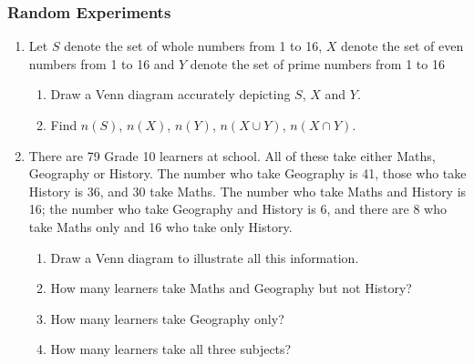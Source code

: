             \subsubsection{  Random Experiments }
            \nopagebreak
          \label{m39377*id111123}\begin{enumerate}[noitemsep, label=\textbf{\arabic*}. ] 
            \label{m39377*uid16}\item  Let $S$ denote the set of
whole numbers from 1 to 16,
$X$ denote the
set of even numbers from 1 to 16 and
$Y$ denote the
set of prime numbers from 1 to 16\label{m39377*id111223}\begin{enumerate}[noitemsep, label=\textbf{\alph*}. ] 
            \label{m39377*uid17}\item Draw a Venn
diagram accurately depicting $S$,
$X$ and \begin{math}Y\end{math}.
\label{m39377*uid18}\item Find $n\left(S\right)$, \begin{math}n\left(X\right)\end{math}, \begin{math}n\left(Y\right)\end{math}, \begin{math}n\left(X\cup Y\right)\end{math}, \begin{math}n\left(X\cap Y\right)\end{math}.
\end{enumerate}
                \label{m39377*uid19}\item There are 79 Grade 10 learners at school. All of
these take either Maths, Geography or History. The number who take Geography is
41, those who take History is 36, and 30 take Maths. The number who take Maths
and History is 16; the number who take Geography and History is 6, and there are
8 who take Maths only and 16 who take only History.
\label{m39377*id111373}\begin{enumerate}[noitemsep, label=\textbf{\alph*}. ] 
            \label{m39377*uid20}\item Draw a Venn diagram to illustrate
all this information.
\label{m39377*uid21}\item How many learners take Maths and Geography but not
History?
\label{m39377*uid22}\item How many learners take Geography only?
\label{m39377*uid23}\item How many learners take all three subjects?

\end{enumerate}
\end{enumerate}
